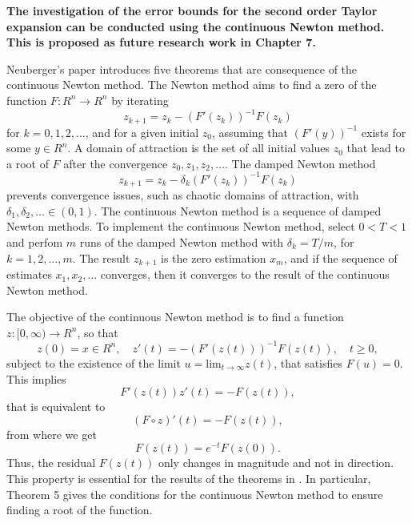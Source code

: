 \documentclass[11pt]{article}
\begin{document}
\begin{itemize}
	{\bfseries The investigation of the error bounds for the second order Taylor expansion can be conducted using the continuous Newton method. This is proposed as future research work in Chapter 7.}
	
	\color{blue}
	Neuberger's paper \cite{Neuberger07} introduces five theorems that are consequence of the continuous Newton method.
	The Newton method aims to find a zero of the function $F: R^n \rightarrow R^n$ by iterating
	\begin{equation} z_{k+1} = z_k - \left(F' (z_k) \right)^{-1} F(z_k) \end{equation}
	for $k=0,1,2,\ldots$, and for a given initial $z_0$, assuming that $\left(F' (y) \right)^{-1}$ exists for some $y \in R^n$.
	A domain of attraction is the set of all initial values $z_0$ that lead to a root of $F$ after the convergence $z_0, z_1, z_2,\ldots$.
	The damped Newton method  
	\begin{equation} z_{k+1} = z_k - \delta_k \left(F' (z_k) \right)^{-1} F(z_k) \end{equation}
	prevents convergence issues, such as chaotic domains of attraction, with $\delta_1, \delta_2, \ldots \in (0, 1)$. 
	The continuous Newton method is a sequence of damped Newton methods. To implement the continuous Newton method, select $0<T<1$ and perfom $m$ runs of the damped Newton method with $\delta_k = T/m$, for $k=1,2,\ldots, m$.
	The result $z_{k+1}$ is the zero estimation $x_m$, and if the sequence of estimates $x_1, x_2, \ldots$ converges, then it converges to the result of the continuous Newton method.
	
	The objective of the continuous Newton method is to find a function $z: [0, \infty) \rightarrow R^n$, so that
    \begin{equation} z(0) = x \in R^n, \quad z' (t) = - \left(F' (z(t)) \right)^{-1} F(z(t)), \quad t \geq 0, \label{eqn:contNewton}\end{equation}
    subject to the existence of the limit $u=\mathrm{lim}_{t \rightarrow \infty}{z(t)}$, that satisfies $F(u)=0$.
    This implies 
    \begin{equation}  F' (z(t)) z' (t) = - F(z(t)) , \end{equation}
    that is equivalent to
    \begin{equation}  \left(F \circ z\right)' (t) = - F(z(t)) , \end{equation}
    from where we get
    \begin{equation}  F(z(t)) = e^{-t} F(z(0)) . \end{equation}
    Thus, the residual $F(z(t))$ only changes in magnitude and not in direction.
    This property is essential for the results of the theorems in \cite{Neuberger07}. 
    In particular, Theorem 5 gives the conditions for the continuous Newton method to ensure finding a root of the function.
    

\end{itemize}
\end{document}
